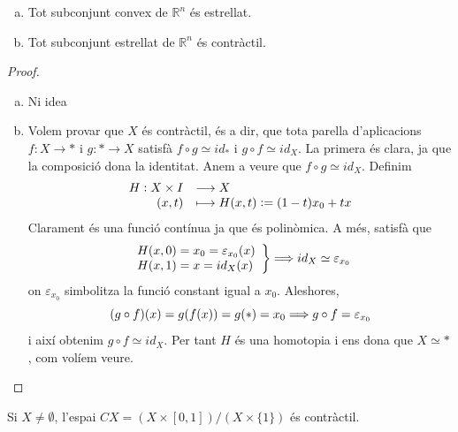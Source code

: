 \documentclass[../main.tex]{subfiles}
\begin{document}
\begin{prop}
[Exercici 7]\label{exercici1.7}
\begin{enumerate}[(a)]
    \item Tot subconjunt convex de $\mathbb{R}^n$ és estrellat.
    \item Tot subconjunt estrellat de $\mathbb{R}^n$ és contràctil.
\end{enumerate}
\end{prop}
\begin{proof}
\begin{enumerate}[(a)]
    \item Ni idea
    \item Volem provar que $X$ és contràctil, és a dir, que tota parella d'aplicacions $f:X\rightarrow *$ i $g:*\rightarrow X$ satisfà $f\circ g\simeq id_*$ i $g\circ f\simeq id_X$. La primera és clara, ja que la composició dona la identitat. Anem a veure que $f\circ g\simeq id_X$. Definim
    \begin{equation}
        \notag
        \begin{array}{rl}
            H:X\times I & \longrightarrow X \\
            (x,t) & \longmapsto H(x,t):=(1-t)x_0+tx
        \end{array}
    \end{equation}
    Clarament és una funció contínua ja que és polinòmica. A més, satisfà que
    \begin{equation}
        \notag
        \left.
        \begin{array}{ll}
            H(x,0) = x_0 = \varepsilon_{x_0}(x) \\
            H(x,1) = x = id_X(x)
        \end{array}
        \right\} \Longrightarrow id_X\simeq \varepsilon_{x_0}
    \end{equation}
    on $\varepsilon_{x_0}$ simbolitza la funció constant igual a $x_0$. Aleshores,
    \begin{equation}
        \notag
        (g\circ f)(x) = g(f(x))= g(*) = x_0\Longrightarrow g\circ f= \varepsilon_{x_0}
    \end{equation}
    i així obtenim $g\circ f\simeq id_X$. Per tant $H$ és una homotopia i ens dona que $X\simeq *$, com volíem veure.
\end{enumerate}
\end{proof}

\begin{ej}
[Exercici 9]\label{exercici1.9} Si $X\not=\emptyset$, l'espai $CX=(X\times [0,1])/(X\times \{1\})$ és contràctil.
\end{ej}
\end{document}
